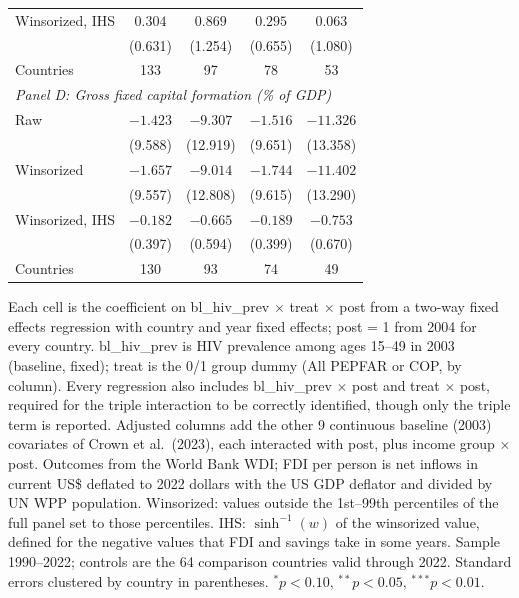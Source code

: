 \begin{table}[htbp]
\begin{tabular}{lcccc}
Winsorized, IHS & $0.304$ & $0.869$ & $0.295$ & $0.063$ \\
 & (0.631) & (1.254) & (0.655) & (1.080) \\
Countries & 133 & 97 & 78 & 53 \\
\midrule
\multicolumn{5}{l}{\textit{Panel D: Gross fixed capital formation (\% of GDP)}} \\
Raw & $-1.423$ & $-9.307$ & $-1.516$ & $-11.326$ \\
 & (9.588) & (12.919) & (9.651) & (13.358) \\
Winsorized & $-1.657$ & $-9.014$ & $-1.744$ & $-11.402$ \\
 & (9.557) & (12.808) & (9.615) & (13.290) \\
Winsorized, IHS & $-0.182$ & $-0.665$ & $-0.189$ & $-0.753$ \\
 & (0.397) & (0.594) & (0.399) & (0.670) \\
Countries & 130 & 93 & 74 & 49 \\
\bottomrule
\end{tabular}
\par\vspace{4pt}
\begin{minipage}{\textwidth}\footnotesize Each cell is the coefficient on bl\_hiv\_prev $\times$ treat $\times$ post from a two-way fixed effects regression with country and year fixed effects; post = 1 from 2004 for every country. bl\_hiv\_prev is HIV prevalence among ages 15--49 in 2003 (baseline, fixed); treat is the 0/1 group dummy (All PEPFAR or COP, by column). Every regression also includes bl\_hiv\_prev $\times$ post and treat $\times$ post, required for the triple interaction to be correctly identified, though only the triple term is reported. Adjusted columns add the other 9 continuous baseline (2003) covariates of Crown et al.\ (2023), each interacted with post, plus income group $\times$ post. Outcomes from the World Bank WDI; FDI per person is net inflows in current US\$ deflated to 2022 dollars with the US GDP deflator and divided by UN WPP population. Winsorized: values outside the 1st--99th percentiles of the full panel set to those percentiles. IHS: $\sinh^{-1}(w)$ of the winsorized value, defined for the negative values that FDI and savings take in some years. Sample 1990--2022; controls are the 64 comparison countries valid through 2022. Standard errors clustered by country in parentheses. $^{*}p<0.10$, $^{**}p<0.05$, $^{***}p<0.01$.\end{minipage}
\end{table}
